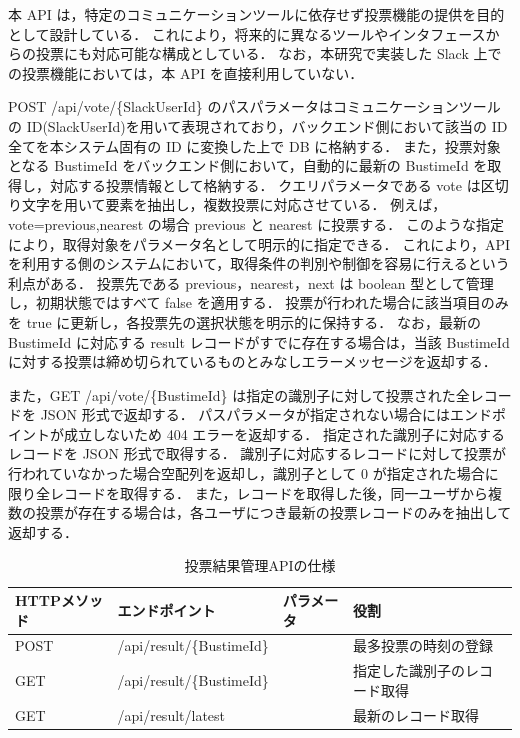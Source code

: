 本 API は，特定のコミュニケーションツールに依存せず投票機能の提供を目的として設計している．
これにより，将来的に異なるツールやインタフェースからの投票にも対応可能な構成としている．
なお，本研究で実装した Slack 上での投票機能においては，本 API を直接利用していない．


POST /api/vote/\{SlackUserId\} のパスパラメータはコミュニケーションツールの ID(SlackUserId)を用いて表現されており，バックエンド側において該当の ID 全てを本システム固有の ID に変換した上で DB に格納する．
また，投票対象となる BustimeId をバックエンド側において，自動的に最新の BustimeId を取得し，対応する投票情報として格納する．
クエリパラメータである vote は区切り文字を用いて要素を抽出し，複数投票に対応させている．
例えば，vote=previous,nearest の場合 previous と nearest に投票する．
このような指定により，取得対象をパラメータ名として明示的に指定できる．
これにより，API を利用する側のシステムにおいて，取得条件の判別や制御を容易に行えるという利点がある．
投票先である previous，nearest，next は boolean 型として管理し，初期状態ではすべて false を適用する．
投票が行われた場合に該当項目のみを true に更新し，各投票先の選択状態を明示的に保持する．
なお，最新の BustimeId に対応する result レコードがすでに存在する場合は，当該 BustimeId に対する投票は締め切られているものとみなしエラーメッセージを返却する．

また，GET /api/vote/\{BustimeId\} は指定の識別子に対して投票された全レコードを JSON 形式で返却する．
パスパラメータが指定されない場合にはエンドポイントが成立しないため 404 エラーを返却する．
指定された識別子に対応するレコードを JSON 形式で取得する．
識別子に対応するレコードに対して投票が行われていなかった場合空配列を返却し，識別子として 0 が指定された場合に限り全レコードを取得する．
また，レコードを取得した後，同一ユーザから複数の投票が存在する場合は，各ユーザにつき最新の投票レコードのみを抽出して返却する．


\begin{table}[htb]
  \captionsetup[table]{justification=centering}
  \centering
  \caption{投票結果管理APIの仕様}
  \label{tab:resultAPI}
  \begin{tabular}{|
    >{\centering\arraybackslash}m{1.5cm}|
    >{\centering\arraybackslash}m{6cm}|
    >{\centering\arraybackslash}m{2cm}|
    >{\centering\arraybackslash}m{3cm}|}
    \hline
    \textbf{HTTPメソッド} & \textbf{エンドポイント}          & \textbf{パラメータ} & \textbf{役割} \\
    \hline
    POST
                      & /api/result/\{BustimeId\}
                      &
                      & 最多投票の時刻の登録                                               \\
    \hline
    GET
                      & /api/result/\{BustimeId\}
                      &
                      & 指定した識別子のレコード取得                                           \\
    \hline
    GET
                      & /api/result/latest
                      &
                      & 最新のレコード取得                                                \\
    \hline
  \end{tabular}
\end{table}

